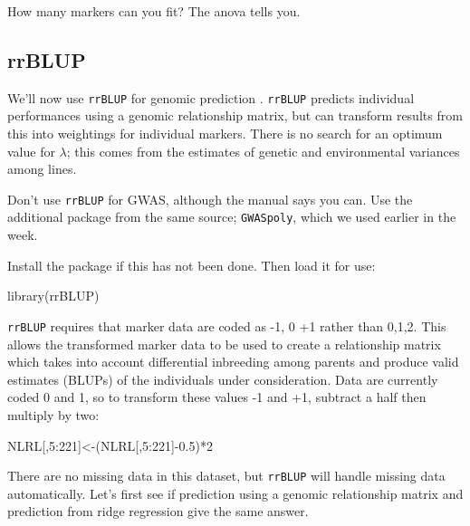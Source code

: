 \documentclass[
]{book}
\makeatletter
\newenvironment{Shaded}{\begin{snugshade}}{\end{snugshade}}
\newcommand{\DecValTok}[1]{\textcolor[rgb]{0.00,0.00,0.81}{#1}}
\newcommand{\FloatTok}[1]{\textcolor[rgb]{0.00,0.00,0.81}{#1}}
\newcommand{\FunctionTok}[1]{\textcolor[rgb]{0.00,0.00,0.00}{#1}}
\newcommand{\NormalTok}[1]{#1}
\newcommand{\OtherTok}[1]{\textcolor[rgb]{0.56,0.35,0.01}{#1}}
\newcommand{\SpecialCharTok}[1]{\textcolor[rgb]{0.00,0.00,0.00}{#1}}
\newenvironment{kframe}{%
\medskip{}
\setlength{\fboxsep}{.8em}
 \def\at@end@of@kframe{}%
 \ifinner\ifhmode%
  \def\at@end@of@kframe{\end{minipage}}%
  \begin{minipage}{\columnwidth}%
 \fi\fi%
 \def\FrameCommand##1{\hskip\@totalleftmargin \hskip-\fboxsep
 \colorbox{shadecolor}{##1}\hskip-\fboxsep
     \hskip-\linewidth \hskip-\@totalleftmargin \hskip\columnwidth}%
 \MakeFramed {\advance\hsize-\width
   \@totalleftmargin\z@ \linewidth\hsize
   \@setminipage}}%
 {\par\unskip\endMakeFramed%
 \at@end@of@kframe}
\newenvironment{rmdblock}[1]
  {
  \begin{itemize}
  \renewcommand{\labelitemi}{
    \raisebox{-.7\height}[0pt][0pt]{
      {\setkeys{Gin}{width=3em,keepaspectratio}\texttt{[image: images/\#1]}}
    }
  }
  \setlength{\fboxsep}{1em}
  \begin{kframe}
  \item
  }
  {
  \end{kframe}
  \end{itemize}
  }
\newenvironment{rmdnote}
  {\begin{rmdblock}{note}}
  {\end{rmdblock}}
\makeatother
\begin{document}
How many markers can you fit? The anova tells you.

\hypertarget{rrblup}{%
\subsection{rrBLUP}\label{rrblup}}

We'll now use \texttt{rrBLUP} for genomic prediction . \texttt{rrBLUP} predicts individual performances
using a genomic relationship matrix, but can transform results from this into weightings for
individual markers. There is no search for an optimum value for \(λ\); this comes from the
estimates of genetic and environmental variances among lines.

\begin{rmdnote}
Don't use \texttt{rrBLUP} for GWAS, although the manual says you can. Use the additional
package from the same source; \texttt{GWASpoly}, which we used earlier in the week.
\end{rmdnote}

Install the package if this has not been done. Then load it for use:

\begin{Shaded}
\begin{Highlighting}[]
\FunctionTok{library}\NormalTok{(rrBLUP)}
\end{Highlighting}
\end{Shaded}

\texttt{rrBLUP} requires that marker data are coded as -1, 0 +1 rather than 0,1,2. This allows the transformed marker data to be used to create a relationship matrix which takes into account differential inbreeding among parents and produce valid estimates (BLUPs) of the individuals under consideration. Data are currently coded 0 and 1, so to transform these values -1 and +1, subtract a half then multiply by two:

\begin{Shaded}
\begin{Highlighting}[]
\NormalTok{NLRL[,}\DecValTok{5}\SpecialCharTok{:}\DecValTok{221}\NormalTok{]}\OtherTok{\textless{}{-}}\NormalTok{(NLRL[,}\DecValTok{5}\SpecialCharTok{:}\DecValTok{221}\NormalTok{]}\SpecialCharTok{{-}}\FloatTok{0.5}\NormalTok{)}\SpecialCharTok{*}\DecValTok{2}
\end{Highlighting}
\end{Shaded}

There are no missing data in this dataset, but \texttt{rrBLUP} will handle missing data automatically. Let's first see if prediction using a genomic relationship matrix and prediction from ridge regression give the same answer.
\end{document}
